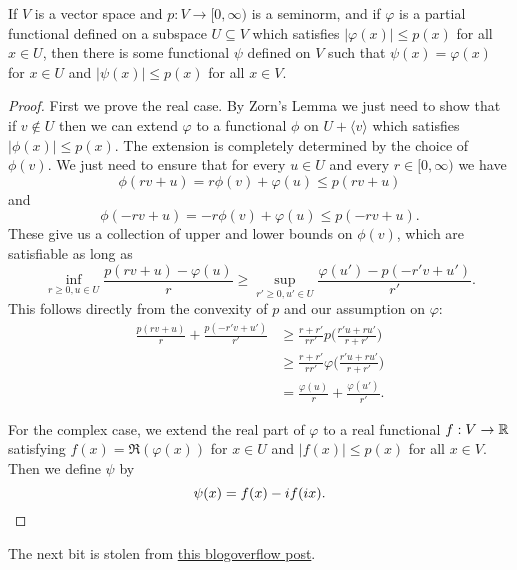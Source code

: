 \begin{thm} If $V$ is a vector space and $p : V \rightarrow [0,\infty)$ is a seminorm, and if $\varphi$ is a partial functional defined on a subspace $U \subseteq V$ which satisfies $|\varphi(x)| \le p(x)$ for all $x \in U$, then there is some functional $\psi$ defined on $V$ such that $\psi(x) = \varphi(x)$ for $x \in U$ and $|\psi(x)| \le p(x)$ for all $x \in V$.
\end{thm}
\begin{proof} First we prove the real case. By Zorn's Lemma we just need to show that if $v \not\in U$ then we can extend $\varphi$ to a functional $\phi$ on $U + \langle v \rangle$ which satisfies $|\phi(x)| \le p(x)$. The extension is completely determined by the choice of $\phi(v)$. We just need to ensure that for every $u \in U$ and every $r \in [0,\infty)$ we have
\[
\phi(rv + u) = r\phi(v) + \varphi(u) \le p(rv + u)
\]
and
\[
\phi(-rv + u) = -r\phi(v) + \varphi(u) \le p(-rv + u).
\]
These give us a collection of upper and lower bounds on $\phi(v)$, which are satisfiable as long as
\[
\inf_{r\ge 0, u \in U} \frac{p(rv + u) - \varphi(u)}{r} \ge \sup_{r' \ge 0, u' \in U} \frac{\varphi(u') - p(-r'v + u')}{r'}.
\]
This follows directly from the convexity of $p$ and our assumption on $\varphi$:
\begin{align*}
\frac{p(rv + u)}{r} + \frac{p(-r'v + u')}{r'} &\ge \frac{r + r'}{rr'}p\Big(\frac{r'u + ru'}{r + r'}\Big)\\
&\ge \frac{r + r'}{rr'}\varphi\Big(\frac{r'u + ru'}{r + r'}\Big)\\
&= \frac{\varphi(u)}{r} + \frac{\varphi(u')}{r'}.
\end{align*}

For the complex case, we extend the real part of $\varphi$ to a real functional $f : V \rightarrow \mathbb{R}$ satisfying $f(x) = \Re(\varphi(x))$ for $x \in U$ and $|f(x)| \le p(x)$ for all $x \in V$. Then we define $\psi$ by
\[
\psi(x) = f(x) - if(ix).\qedhere
\]
\end{proof}

The next bit is stolen from \href{https://math.blogoverflow.com/2014/06/25/zabreikos-lemma-and-four-fundamental-theorems-of-functional-analysis/}{this blogoverflow post}.

